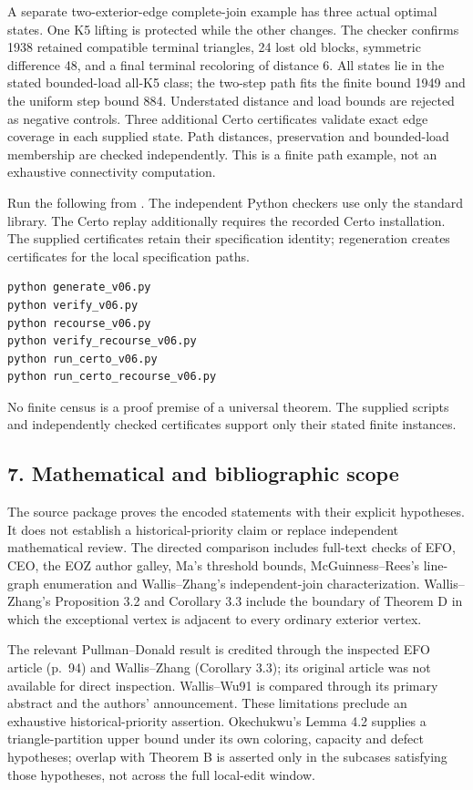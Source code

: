 \documentclass[english,11pt,a4paper]{article}
\begin{document}
A separate two-exterior-edge complete-join example has three actual
optimal states. One K5 lifting is protected while the other changes. The
checker confirms 1938 retained compatible terminal triangles, 24 lost
old blocks, symmetric difference 48, and a final terminal recoloring of
distance 6. All states lie in the stated bounded-load all-K5 class; the
two-step path fits the finite bound 1949 and the uniform step bound 884.
Understated distance and load bounds are rejected as negative controls.
Three additional Certo certificates validate exact edge coverage in each
supplied state. Path distances, preservation and bounded-load membership
are checked independently. This is a finite path example, not an
exhaustive connectivity computation.

Run the following from . The independent
Python checkers use only the standard library. The Certo replay
additionally requires the recorded Certo installation. The supplied
certificates retain their specification identity; regeneration creates
certificates for the local specification paths.

\begin{verbatim}
python generate_v06.py
python verify_v06.py
python recourse_v06.py
python verify_recourse_v06.py
python run_certo_v06.py
python run_certo_recourse_v06.py
\end{verbatim}

No finite census is a proof premise of a universal theorem. The supplied
scripts and independently checked certificates support only their stated
finite instances.

\subsection{7. Mathematical and bibliographic
scope}\label{mathematical-and-bibliographic-scope}

The source package proves the encoded statements with their explicit
hypotheses. It does not establish a historical-priority claim or replace
independent mathematical review. The directed comparison includes
full-text checks of EFO, CEO, the EOZ author galley, Ma's threshold
bounds, McGuinness--Rees's line-graph enumeration and Wallis--Zhang's
independent-join characterization. Wallis--Zhang's Proposition 3.2 and
Corollary 3.3 include the boundary of Theorem D in which the exceptional
vertex is adjacent to every ordinary exterior vertex.

The relevant Pullman--Donald result is credited through the inspected
EFO article (p.~94) and Wallis--Zhang (Corollary 3.3); its original
article was not available for direct inspection. Wallis--Wu91 is
compared through its primary abstract and the authors' announcement.
These limitations preclude an exhaustive historical-priority assertion.
Okechukwu's Lemma 4.2 supplies a triangle-partition upper bound under
its own coloring, capacity and defect hypotheses; overlap with Theorem B
is asserted only in the subcases satisfying those hypotheses, not across
the full local-edit window.
\end{document}
